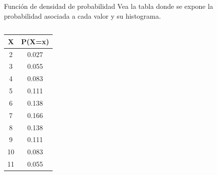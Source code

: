 \documentclass[11pt]{beamer}
\begin{document}
        \begin{frame}{Función de densidad de probabilidad}
            Vea la tabla donde se expone la probabilidad asociada a cada valor y su histograma.
            \begin{columns}
                \begin{column}{0.4\textwidth}
                    \begin{center}
                        \begin{tabular}{c|c}
                            X & P(X=x)\\
                            \hline
                            2 & 0.027 \\

                            3 & 0.055 \\

                            4 & 0.083 \\

                            5 & 0.111 \\

                            6 & 0.138 \\

                            7 & 0.166 \\

                            8 & 0.138 \\

                            9 & 0.111 \\

                            10 & 0.083 \\

                            11 & 0.055 \\


\end{tabular}
\end{center}
\end{column}
\end{columns}
\end{frame}
\end{document}
